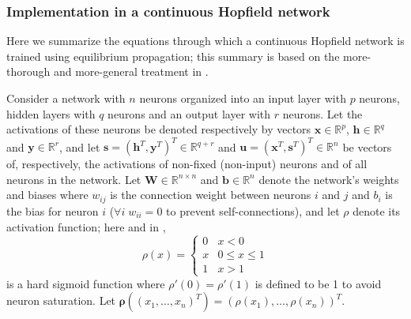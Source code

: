 \documentclass[utf8]{frontiersSCNS}
\newcommand{\mtx}[1]{\bm{#1}}
\begin{document}
\subsubsection{Implementation in a continuous Hopfield network}

Here we summarize the equations through which a continuous Hopfield network is trained using equilibrium propagation; this summary is based on the more-thorough and more-general treatment in \citep{scellier17}.

Consider a network with $n$ neurons organized into an input layer with $p$ neurons, hidden layers with $q$ neurons and an output layer with $r$ neurons. Let the activations of these neurons be denoted respectively by vectors $\mtx{x}\in\mathbb{R}^{p}$, $\mtx{h}\in\mathbb{R}^{q}$ and $\mtx{y}\in\mathbb{R}^{r}$, and let $\mtx{s}=(\mtx{h}^{T},\mtx{y}^{T})^{T}\in\mathbb{R}^{q+r}$ and $\mtx{u}=(\mtx{x}^{T}, \mtx{s}^{T})^{T}\in\mathbb{R}^{n}$ be vectors of, respectively, the activations of non-fixed (non-input) neurons and of all neurons in the network. Let $\mtx{W}\in\mathbb{R}^{n\times n}$ and $\mtx{b}\in\mathbb{R}^{n}$ denote the network's weights and biases where $w_{ij}$ is the connection weight between neurons $i$ and $j$ and $b_i$ is the bias for neuron $i$ ($\forall i \;w_{ii}=0$ to prevent self-connections), and let $\rho$ denote its activation function; here and in \citep{scellier17},
\begin{equation}
\rho(x)=\begin{cases}0&x<0\\x&0\leq x\leq 1\\1&x>1\end{cases} \label{eqn:hardened_sigmoid}
\end{equation}
 is a hard sigmoid function
where $\rho'(0)=\rho'(1)$ is defined to be 1 to avoid neuron saturation. Let $\mtx{\rho}((x_1,\hdots, x_n)^T)=(\rho(x_1),\hdots,\rho(x_n))^T$.
\end{document}
